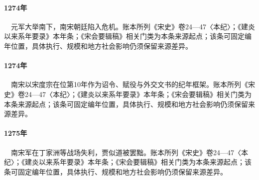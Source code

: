 \paragraph{1274年}　元军大举南下，南宋朝廷陷入危机。账本所列《宋史》卷24—47〈本纪〉；《建炎以来系年要录》本年条；《宋会要辑稿》相关门类为本条来源起点；该条可固定编年位置，具体执行、规模和地方社会影响仍须保留来源差异。

\paragraph{1274年}　南宋以宋度宗在位第10年作为诏令、赋役与外交文书的纪年框架。账本所列《宋史》卷24—47〈本纪〉；《建炎以来系年要录》本年条；《宋会要辑稿》相关门类为本条来源起点；该条可固定编年位置，具体执行、规模和地方社会影响仍须保留来源差异。

\paragraph{1275年}　南宋军在丁家洲等战场失利，贾似道被罢黜。账本所列《宋史》卷24—47〈本纪〉；《建炎以来系年要录》本年条；《宋会要辑稿》相关门类为本条来源起点；该条可固定编年位置，具体执行、规模和地方社会影响仍须保留来源差异。
